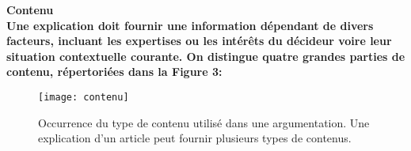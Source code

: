\documentclass[a4paper, 11pt]{article}
\renewcommand{\textbf}[1]{\begingroup\bfseries\mathversion{bold}#1\endgroup}
\begin{document}
\begin{comment}


\end{comment}


\textbf{Contenu}\\

Une explication doit fournir une information dépendant de divers facteurs, incluant les expertises ou les intérêts du décideur voire leur situation contextuelle courante. On distingue quatre grandes parties de contenu, répertoriées dans la Figure 3:

\begin{figure}[!ht]
\begin{center}
	\texttt{[image: contenu]}
	\caption{Occurrence du type de contenu utilisé dans une argumentation. Une explication d'un article peut fournir plusieurs types de contenus.}
\end{center}
\end{figure}
\end{document}
